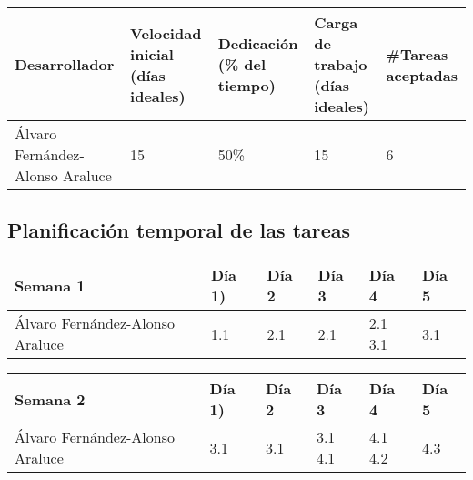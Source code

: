 \begin{table}[h]
	\centering
	\begin{tabular}{| p{3cm} | p{2cm} | p{2cm} | p{2cm} | p{2cm} |}
		\rowcolor[HTML]{329A9D} 
		{\color[HTML]{FFFFFF} \textbf{Desarrollador}} & {\color[HTML]{FFFFFF} \textbf{Velocidad inicial (días ideales)}} & {\color[HTML]{FFFFFF} \textbf{Dedicación (\% del tiempo)}} & {\color[HTML]{FFFFFF} \textbf{Carga de trabajo (días ideales)}} & {\color[HTML]{FFFFFF} \textbf{\#Tareas aceptadas}}  \\ \hline
		Álvaro Fernández-Alonso Araluce & 15 & 50\% & 15 & 6 \\ \hline
	\end{tabular}
\end{table}

\newpage

\subsection{Planificación temporal de las tareas}

\begin{table}[h]
	\centering
	\begin{tabular}{| p{2cm} | p{2cm} | p{2cm} | p{2cm} | p{2cm} | p{2cm} |}
		\rowcolor[HTML]{329A9D} 
		 {\color[HTML]{FFFFFF} \textbf{Semana 1}} & {\color[HTML]{FFFFFF} \textbf{Día 1)}} & {\color[HTML]{FFFFFF} \textbf{Día 2}} & {\color[HTML]{FFFFFF} \textbf{Día 3}} & {\color[HTML]{FFFFFF} \textbf{Día 4}}  & {\color[HTML]{FFFFFF} \textbf{Día 5}} \\ \hline
		Álvaro Fernández-Alonso Araluce & 1.1 & 2.1 & 2.1 & 2.1 3.1 & 3.1 \\ \hline
	\end{tabular}
\end{table}

\begin{table}[h]
	\centering
	\begin{tabular}{| p{2cm} | p{2cm} | p{2cm} | p{2cm} | p{2cm} | p{2cm} |}
		\rowcolor[HTML]{329A9D} 
		{\color[HTML]{FFFFFF} \textbf{Semana 2}} & {\color[HTML]{FFFFFF} \textbf{Día 1)}} & {\color[HTML]{FFFFFF} \textbf{Día 2}} & {\color[HTML]{FFFFFF} \textbf{Día 3}} & {\color[HTML]{FFFFFF} \textbf{Día 4}}  & {\color[HTML]{FFFFFF} \textbf{Día 5}} \\ \hline
		Álvaro Fernández-Alonso Araluce & 3.1 & 3.1 & 3.1 4.1 & 4.1 4.2 & 4.3 \\ \hline
	\end{tabular}
\end{table}

